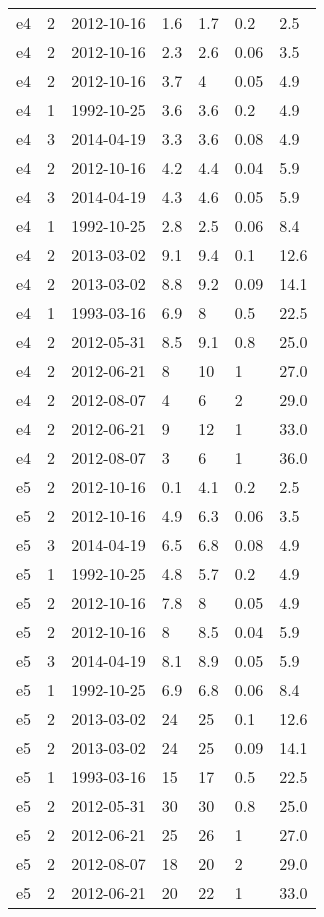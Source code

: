 \begin{table*}[htp]
\begin{tabular}{llll}
e4 & 2 & 2012-10-16 & 1.6 & 1.7 & 0.2 & 2.5 \\
e4 & 2 & 2012-10-16 & 2.3 & 2.6 & 0.06 & 3.5 \\
e4 & 2 & 2012-10-16 & 3.7 & 4 & 0.05 & 4.9 \\
e4 & 1 & 1992-10-25 & 3.6 & 3.6 & 0.2 & 4.9 \\
e4 & 3 & 2014-04-19 & 3.3 & 3.6 & 0.08 & 4.9 \\
e4 & 2 & 2012-10-16 & 4.2 & 4.4 & 0.04 & 5.9 \\
e4 & 3 & 2014-04-19 & 4.3 & 4.6 & 0.05 & 5.9 \\
e4 & 1 & 1992-10-25 & 2.8 & 2.5 & 0.06 & 8.4 \\
e4 & 2 & 2013-03-02 & 9.1 & 9.4 & 0.1 & 12.6 \\
e4 & 2 & 2013-03-02 & 8.8 & 9.2 & 0.09 & 14.1 \\
e4 & 1 & 1993-03-16 & 6.9 & 8 & 0.5 & 22.5 \\
e4 & 2 & 2012-05-31 & 8.5 & 9.1 & 0.8 & 25.0 \\
e4 & 2 & 2012-06-21 & 8 & 10 & 1 & 27.0 \\
e4 & 2 & 2012-08-07 & 4 & 6 & 2 & 29.0 \\
e4 & 2 & 2012-06-21 & 9 & 12 & 1 & 33.0 \\
e4 & 2 & 2012-08-07 & 3 & 6 & 1 & 36.0 \\
e5 & 2 & 2012-10-16 & 0.1 & 4.1 & 0.2 & 2.5 \\
e5 & 2 & 2012-10-16 & 4.9 & 6.3 & 0.06 & 3.5 \\
e5 & 3 & 2014-04-19 & 6.5 & 6.8 & 0.08 & 4.9 \\
e5 & 1 & 1992-10-25 & 4.8 & 5.7 & 0.2 & 4.9 \\
e5 & 2 & 2012-10-16 & 7.8 & 8 & 0.05 & 4.9 \\
e5 & 2 & 2012-10-16 & 8 & 8.5 & 0.04 & 5.9 \\
e5 & 3 & 2014-04-19 & 8.1 & 8.9 & 0.05 & 5.9 \\
e5 & 1 & 1992-10-25 & 6.9 & 6.8 & 0.06 & 8.4 \\
e5 & 2 & 2013-03-02 & 24 & 25 & 0.1 & 12.6 \\
e5 & 2 & 2013-03-02 & 24 & 25 & 0.09 & 14.1 \\
e5 & 1 & 1993-03-16 & 15 & 17 & 0.5 & 22.5 \\
e5 & 2 & 2012-05-31 & 30 & 30 & 0.8 & 25.0 \\
e5 & 2 & 2012-06-21 & 25 & 26 & 1 & 27.0 \\
e5 & 2 & 2012-08-07 & 18 & 20 & 2 & 29.0 \\
e5 & 2 & 2012-06-21 & 20 & 22 & 1 & 33.0 \\

\end{tabular}
\end{table*}
